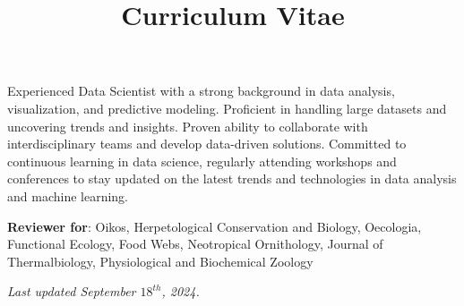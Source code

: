 \documentclass[a4paper, skipsamekey, 11pt, english]{curve}
\title{Curriculum Vitae}
\begin{document}
\makeheaders[c]
\vspace{-10pt}

Experienced Data Scientist with a strong background in data analysis, visualization, and predictive modeling. Proficient in handling large datasets and uncovering trends and insights. Proven ability to collaborate with interdisciplinary teams and develop data-driven solutions. Committed to continuous learning in data science, regularly attending workshops and conferences to stay updated on the latest trends and technologies in data analysis and machine learning.
\vspace{10pt}

\vspace{-10pt}
\textbf{Reviewer for}:  Oikos, Herpetological Conservation and Biology, Oecologia, Functional Ecology, Food Webs, Neotropical Ornithology, Journal of Thermalbiology, Physiological and Biochemical Zoology
\\
\vspace{10pt}


\textit{Last updated September $18^{th}$, 2024.}
\end{document}
